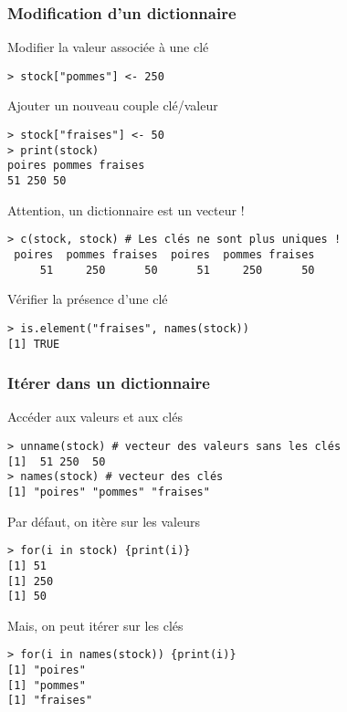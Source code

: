 \documentclass[10pt]{beamer}
\begin{document}
\begin{frame}[fragile]
  \frametitle{Modification d'un dictionnaire }

\begin{block}{Modifier la valeur associée à une clé}
  \begin{lstlisting}[style=block]
> stock["pommes"] <- 250 
\end{lstlisting}
\end{block}

\begin{block}{Ajouter un nouveau couple clé/valeur}
  \begin{lstlisting}[style=block]
> stock["fraises"] <- 50
> print(stock)
poires pommes fraises
51 250 50    
\end{lstlisting}
\end{block}

\begin{block}{Attention, un dictionnaire est un vecteur !}
\begin{lstlisting}[style=block]
> c(stock, stock) # Les clés ne sont plus uniques !
 poires  pommes fraises  poires  pommes fraises 
     51     250      50      51     250      50   
   \end{lstlisting}
 \end{block}

 \begin{block}{Vérifier la présence d'une clé}
    \begin{lstlisting}[style=block]
> is.element("fraises", names(stock))
[1] TRUE
\end{lstlisting}
\end{block}


\end{frame}

\begin{frame}[fragile]
  \frametitle{Itérer dans un dictionnaire}
  \begin{block}{Accéder aux valeurs et aux clés}
    \begin{lstlisting}[style=block]
> unname(stock) # vecteur des valeurs sans les clés
[1]  51 250  50
> names(stock) # vecteur des clés
[1] "poires" "pommes" "fraises"    
\end{lstlisting}    
\end{block}

\begin{block}{Par défaut, on itère sur les valeurs}
\begin{lstlisting}[style=block]
> for(i in stock) {print(i)}
[1] 51
[1] 250
[1] 50  
\end{lstlisting}
\end{block}

\begin{block}{Mais, on peut itérer sur les clés}
\begin{lstlisting}[style=block]
> for(i in names(stock)) {print(i)}
[1] "poires"
[1] "pommes"
[1] "fraises"  
\end{lstlisting}
\end{block}
\end{frame}
\end{document}
